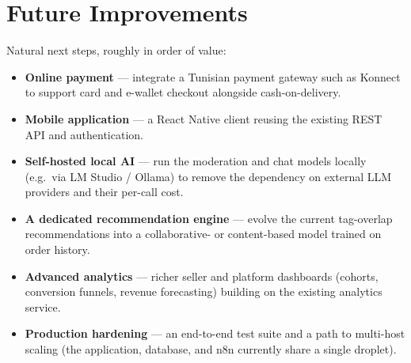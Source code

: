 \documentclass[12pt, a4paper, oneside]{report}
\begin{document}
\section*{Future Improvements}

Natural next steps, roughly in order of value:

\begin{itemize}[leftmargin=*,itemsep=2pt]
  \item \textbf{Online payment} --- integrate a Tunisian payment
        gateway such as Konnect to support card and e-wallet
        checkout alongside cash-on-delivery.
  \item \textbf{Mobile application} --- a React Native client reusing
        the existing REST API and authentication.
  \item \textbf{Self-hosted local AI} --- run the moderation and chat
        models locally (e.g.\ via LM Studio / Ollama) to remove the
        dependency on external LLM providers and their per-call cost.
  \item \textbf{A dedicated recommendation engine} --- evolve the
        current tag-overlap recommendations into a collaborative- or
        content-based model trained on order history.
  \item \textbf{Advanced analytics} --- richer seller and
        platform dashboards (cohorts, conversion funnels, revenue
        forecasting) building on the existing analytics service.
  \item \textbf{Production hardening} --- an end-to-end test
        suite and a path to multi-host scaling (the application,
        database, and n8n currently share a single droplet).
\end{itemize}
\end{document}
